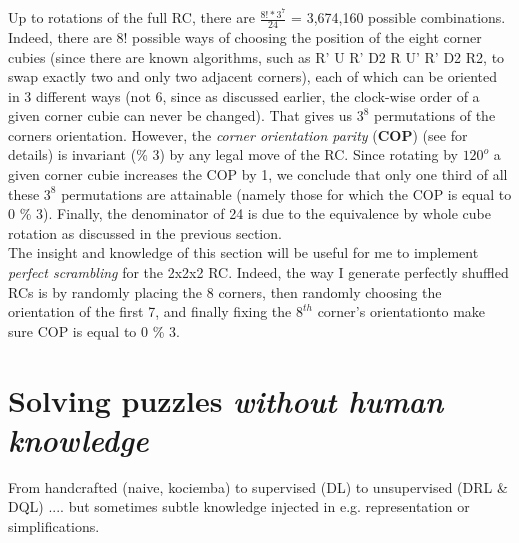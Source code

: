 Up to rotations of the full RC, there are $\frac{8! * 3^{7}}{24}$ = 3,674,160 possible combinations. Indeed, there are 8! possible ways of choosing the position of the eight corner cubies (since there are known algorithms, such as R’ U R’ D2 R U’ R’ D2 R2, to swap exactly two and only two adjacent corners), each of which can be oriented in 3 different ways (not 6, since as discussed earlier, the clock-wise order of a given corner cubie can never be changed). That gives us $3^8$ permutations of the corners orientation. However, the \textit{corner orientation parity} (\textbf{COP}) (see \cite{Schoenert} for details) is invariant (\% 3) by any legal move of the RC. Since rotating by $120^{o}$ a given corner cubie increases the COP by 1, we conclude that only one third of all these $3^8$ permutations are attainable (namely those for which the COP is equal to 0 \% 3). Finally, the denominator of 24 is due to the equivalence by whole cube rotation as discussed in the previous section.
\\
The insight and knowledge of this section will be useful for me to implement \textit{perfect scrambling} for the 2x2x2 RC. Indeed, the way I generate perfectly shuffled RCs is by randomly placing the 8 corners, then randomly choosing the orientation of the first 7, and finally fixing the $8^{th}$ corner's orientationto make sure COP is equal to 0 \% 3.



\section{Solving puzzles \textit{without human knowledge}}

From handcrafted (naive, kociemba) to supervised (DL) to unsupervised (DRL \& DQL) .... but sometimes subtle knowledge injected in e.g. representation or simplifications.



